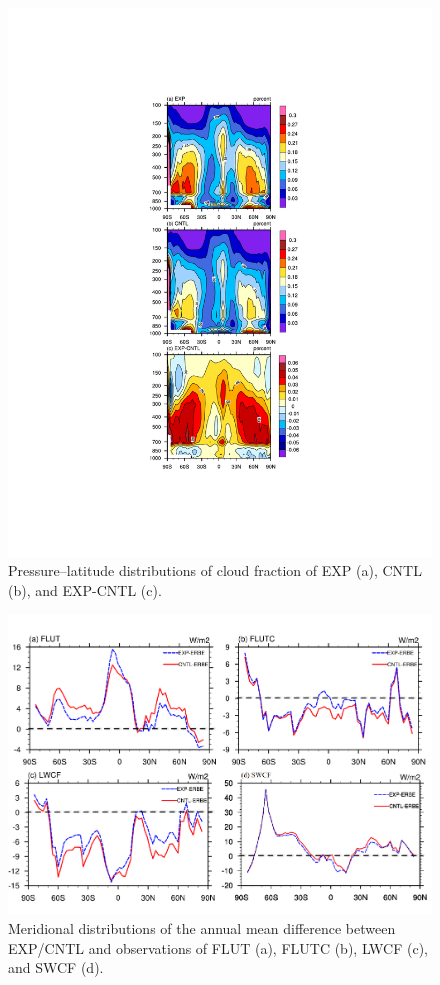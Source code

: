 \documentclass[gmd, manuscript]{copernicus}
\begin{document}
\begin{figure}[t]
\includegraphics[width=15.3cm]{cloud}
\caption{Pressure--latitude distributions of cloud fraction of EXP (a), CNTL (b), and EXP-CNTL (c).}
\end{figure}

\begin{figure}[t]
\includegraphics[width=12cm]{radiation_curve}
\caption{Meridional distributions of the annual mean difference between EXP/CNTL and observations of FLUT (a), FLUTC (b), LWCF (c), and SWCF (d).}
\end{figure}
\end{document}
